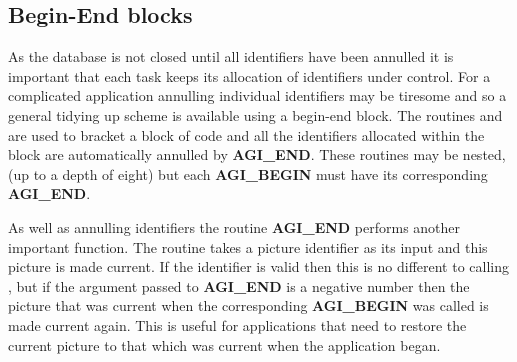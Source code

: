 \documentclass[twoside,11pt]{starlink}
\begin{document}
\subsection{Begin-End blocks\label{bend}}
As the database is not closed until all identifiers have been annulled
it is important that each task keeps its allocation of identifiers
under control. For a complicated application annulling individual
identifiers may be tiresome and so a general tidying up scheme is
available using a begin-end block. The routines
 and
are used to bracket a block of code and all the
identifiers allocated within the block are automatically annulled
by {\bf AGI\_END}. These routines may be nested, (up to a depth of eight)
but each {\bf AGI\_BEGIN} must have its corresponding {\bf AGI\_END}.

As well as annulling identifiers the routine {\bf AGI\_END} performs another
important function. The routine takes a picture identifier as its input
and this picture is made current. If the identifier is valid then this is
no different to calling ,
but if the argument passed to
{\bf AGI\_END} is a negative number then the picture that was current when
the corresponding {\bf AGI\_BEGIN} was called is made current again. This
is useful for applications that need to restore the current picture to
that which was current when the application began.
\end{document}
